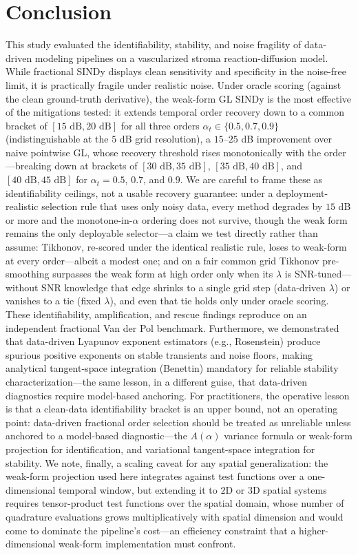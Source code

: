 \documentclass[review,3p,times]{elsarticle}
\begin{document}
\section{Conclusion}
This study evaluated the identifiability, stability, and noise fragility of data-driven modeling pipelines on a vascularized stroma reaction-diffusion model. While fractional SINDy displays clean sensitivity and specificity in the noise-free limit, it is practically fragile under realistic noise. Under oracle scoring (against the clean ground-truth derivative), the weak-form GL SINDy is the most effective of the mitigations tested: it extends temporal order recovery down to a common bracket of $[15\text{ dB}, 20\text{ dB}]$ for all three orders $\alpha_t \in \{0.5, 0.7, 0.9\}$ (indistinguishable at the $5$ dB grid resolution), a $15$--$25$ dB improvement over naive pointwise GL, whose recovery threshold rises monotonically with the order---breaking down at brackets of $[30\text{ dB}, 35\text{ dB}]$, $[35\text{ dB}, 40\text{ dB}]$, and $[40\text{ dB}, 45\text{ dB}]$ for $\alpha_t = 0.5$, $0.7$, and $0.9$. We are careful to frame these as identifiability ceilings, not a usable recovery guarantee: under a deployment-realistic selection rule that uses only noisy data, every method degrades by $15$ dB or more and the monotone-in-$\alpha$ ordering does not survive, though the weak form remains the only deployable selector---a claim we test directly rather than assume: Tikhonov, re-scored under the identical realistic rule, loses to weak-form at every order---albeit a modest one; and on a fair common grid Tikhonov pre-smoothing surpasses the weak form at high order only when its $\lambda$ is SNR-tuned---without SNR knowledge that edge shrinks to a single grid step (data-driven $\lambda$) or vanishes to a tie (fixed $\lambda$), and even that tie holds only under oracle scoring. These identifiability, amplification, and rescue findings reproduce on an independent fractional Van der Pol benchmark. Furthermore, we demonstrated that data-driven Lyapunov exponent estimators (e.g., Rosenstein) produce spurious positive exponents on stable transients and noise floors, making analytical tangent-space integration (Benettin) mandatory for reliable stability characterization---the same lesson, in a different guise, that data-driven diagnostics require model-based anchoring. For practitioners, the operative lesson is that a clean-data identifiability bracket is an upper bound, not an operating point: data-driven fractional order selection should be treated as unreliable unless anchored to a model-based diagnostic---the $A(\alpha)$ variance formula or weak-form projection for identification, and variational tangent-space integration for stability. We note, finally, a scaling caveat for any spatial generalization: the weak-form projection used here integrates against test functions over a one-dimensional temporal window, but extending it to $2$D or $3$D spatial systems requires tensor-product test functions over the spatial domain, whose number of quadrature evaluations grows multiplicatively with spatial dimension and would come to dominate the pipeline's cost---an efficiency constraint that a higher-dimensional weak-form implementation must confront.
\end{document}
